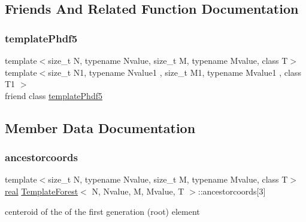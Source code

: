 \subsection{Friends And Related Function Documentation}
\mbox{\label{classTemplateForest_a53f8d71ce667f14931aef7832c1b6c95}} 
\subsubsection{\texorpdfstring{template\+Phdf5}{templatePhdf5}}
{\footnotesize\ttfamily template$<$size\+\_\+t N, typename Nvalue, size\+\_\+t M, typename Mvalue, class T$>$ \\
template$<$size\+\_\+t N1, typename Nvalue1 , size\+\_\+t M1, typename Mvalue1 , class T1 $>$ \\
friend class \mbox{\hyperlink{classtemplatePhdf5}{template\+Phdf5}}\hspace{0.3cm}{\ttfamily [friend]}}



\subsection{Member Data Documentation}
\mbox{\label{classTemplateForest_aa4644b5dd646be3d9e3d71107a33803a}} 
\subsubsection{\texorpdfstring{ancestorcoords}{ancestorcoords}}
{\footnotesize\ttfamily template$<$size\+\_\+t N, typename Nvalue, size\+\_\+t M, typename Mvalue, class T$>$ \\
\mbox{\hyperlink{definitions_8h_aedc0ad84d1e764530814f57ad931d02a}{real}} \mbox{\hyperlink{classTemplateForest}{Template\+Forest}}$<$ N, Nvalue, M, Mvalue, T $>$\+::ancestorcoords\mbox{[}3\mbox{]}\hspace{0.3cm}{\ttfamily [protected]}}

centeroid of the of the first generation (root) element \mbox{\label{classTemplateForest_a0a371d168c81cf8be77b681c27c06409}} 

